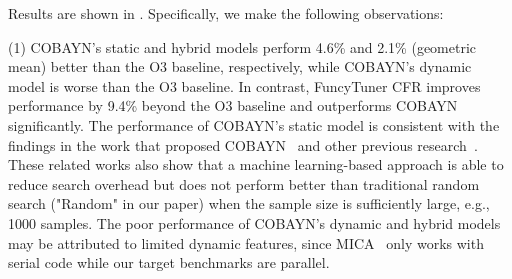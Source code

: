 Results are shown in . Specifically, we make the following observations:

\noindent (1) COBAYN's static and hybrid models perform
4.6\% and 2.1\% (geometric mean) better than the O3 baseline, respectively,
while COBAYN's dynamic model is worse than the O3 baseline.
In contrast, FuncyTuner CFR improves performance by 9.4\% beyond the O3 baseline and outperforms COBAYN significantly.
  The
performance of COBAYN's static model is consistent with the findings
in the work that proposed COBAYN~\cite{cobayn} and other previous
research~\cite{1611549,Cavazos:2007:RSG:1251974.1252540,FursinMGL15}.
These related works also show that
a machine learning-based approach is able to reduce search overhead but
does not perform better than traditional random search ("Random" in our
paper) when the sample size is sufficiently large, e.g., 1000 samples.
The poor performance of COBAYN's dynamic and hybrid models may be
attributed to limited dynamic features, since MICA~\cite{mica} only
works with serial code while our target benchmarks are parallel.

